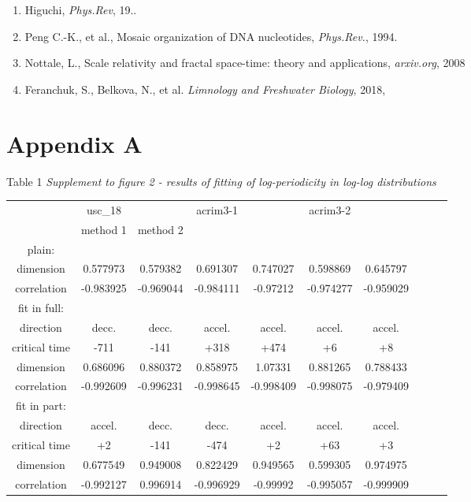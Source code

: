 \documentclass[a4paper]{article}
\begin{document}
\begin{enumerate}

\item Higuchi, \textit{Phys.Rev}, 19..

\item Peng C.-K., et al., Mosaic organization of DNA nucleotides, \textit{Phys.Rev.}, 1994.

\item Nottale, L., Scale relativity and fractal space-time: theory and applications, \textit{arxiv.org}, 2008

\item Feranchuk, S., Belkova, N., et al. \textit{Limnology and Freshwater Biology}, 2018,

\end{enumerate}

\newpage
\section*{Appendix A}

Table 1 \textit{Supplement to figure 2 - results of fitting of log-periodicity in log-log distributions}
\vskip 12pt

{\small{

\begin{tabular}{cccccccccc}
\hline
             & usc\_18        &           & acrim3-1  &           & acrim3-2  &           \\
             & method 1       & method 2  &           &           &           &           \\
\hline
plain: \\
dimension     & 0.577973  & 0.579382  & 0.691307  & 0.747027  & 0.598869  & 0.645797  \\
correlation   & -0.983925 & -0.969044 & -0.984111 & -0.97212  & -0.974277 & -0.959029 \\
\hline
fit in full: \\ 
direction     & decc.     & decc.     & accel.    & accel.    & accel.    & accel.    \\
critical time & -711      & -141      & +318      & +474      & +6        & +8        \\
dimension     & 0.686096  & 0.880372  & 0.858975  & 1.07331   & 0.881265  & 0.788433  \\
correlation   & -0.992609 & -0.996231 & -0.998645 & -0.998409 & -0.998075 & -0.979409 \\
\hline
fit in part: \\
direction     & accel.    & decc.     & decc.     & accel.    & accel.    & accel.    \\
critical time & +2        & -141      & -474      & +2        & +63       & +3        \\
dimension     & 0.677549  & 0.949008  & 0.822429  & 0.949565  & 0.599305  & 0.974975  \\
correlation   & -0.992127 & 0.996914  & -0.996929 & -0.99992  & -0.995057 & -0.999909 \\
\hline
\end{tabular}

}}
\end{document}

